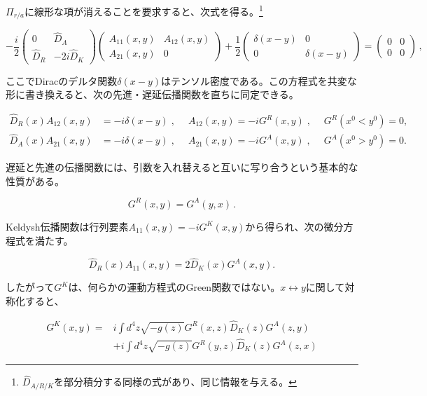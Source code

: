 \documentclass[a4paper,11pt]{ltjsarticle}
\numberwithin{equation}{section}
\begin{document}
$\Pi_{r/a}$に線形な項が消えることを要求すると、次式を得る。\footnote{$\widehat D_{A/R/K}$を部分積分する同様の式があり、同じ情報を与える。}

\begin{equation}
- \frac{i}{2} \begin{pmatrix}
0 & \widehat{D}_{A} \\ \widehat{D}_{R} & -2i\widehat{D}_{K}
\end{pmatrix}\begin{pmatrix}
A_{11}(x,y) & A_{12}(x,y) \\  A_{21}(x,y) & 0
\end{pmatrix}+\frac{1}{2}\begin{pmatrix}
\delta(x-y) & 0 \\  0 & \delta(x-y)
\end{pmatrix}=\begin{pmatrix}
0 & 0 \\  0 & 0
\end{pmatrix}\,,
\end{equation}

ここでDiracのデルタ関数$\delta(x-y)$はテンソル密度である。この方程式を共変な形に書き換えると、次の先進・遅延伝播関数を直ちに同定できる。

\begin{align}
\widehat{D}_{R}(x)A_{12}(x,y)&=-i\delta(x-y)\;,\quad \;A_{12}(x,y)=-iG^{R}(x,y)\;,\quad \; G^{R}(x^{0}<y^{0})=0,\\
\widehat{D}_{A}(x)A_{21}(x,y)&=-i\delta(x-y)\;,\quad \;A_{21}(x,y)=-iG^{A}(x,y)\;,\quad \; G^{A}(x^{0}>y^{0})=0.
\end{align}

遅延と先進の伝播関数には、引数を入れ替えると互いに写り合うという基本的な性質がある。

\begin{equation}\label{eq:Rxy_Ayx}
G^{R}(x,y)=G^{A}(y,x)\,.
\end{equation}

Keldysh伝播関数は行列要素$A_{11}(x,y)=-iG^K(x,y)$から得られ、次の微分方程式を満たす。

\begin{equation}
\widehat{D}_{R}(x)A_{11}(x,y)=2\widehat{D}_{K}(x)G^{A}(x,y).
\end{equation}

したがって$G^K$は、何らかの運動方程式のGreen関数ではない。$x\leftrightarrow y$に関して対称化すると、

\begin{align}\label{eq:Keldyshreff}
G^{K}(x,y)=&i\int d^{4}z \sqrt{-g(z)} G^{R}(x,z)\widehat{D}_{K}(z)G^{A}(z,y) \nonumber \\
&+i\int d^{4}z \sqrt{-g(z)} G^{R}(y,z)\widehat{D}_{K}(z)G^{A}(z,x)
\end{align}
\end{document}
